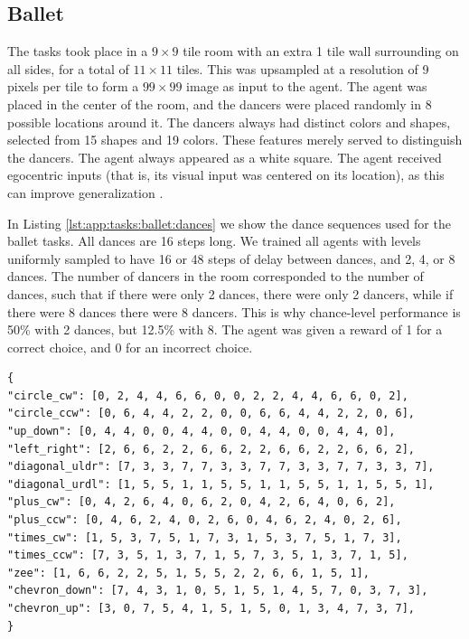 \subsection{Ballet} \label{app:tasks:ballet}
The tasks took place in a \(9 \times 9\) tile room with an extra 1 tile wall surrounding on all sides, for a total of \(11 \times 11\) tiles. This was upsampled at a resolution of 9 pixels per tile to form a \(99 \times 99\) image as input to the agent. The agent was placed in the center of the room, and the dancers were placed randomly in 8 possible locations around it. The dancers always had distinct colors and shapes, selected from 15 shapes and 19 colors. These features merely served to distinguish the dancers. The agent always appeared as a white square. The agent received egocentric inputs (that is, its visual input was centered on its location), as this can improve generalization \citep{hill2019environmental}. 

In Listing \ref{lst:app:tasks:ballet:dances} we show the dance sequences used for the ballet tasks. All dances are 16 steps long. We trained all agents with levels uniformly sampled to have 16 or 48 steps of delay between dances, and 2, 4, or 8 dances. The number of dancers in the room corresponded to the number of dances, such that if there were only 2 dances, there were only 2 dancers, while if there were 8 dances there were 8 dancers. This is why chance-level performance is 50\% with 2 dances, but 12.5\% with 8. The agent was given a reward of 1 for a correct choice, and 0 for an incorrect choice.
\begin{lstfloat}
\begin{lstlisting}
{
"circle_cw": [0, 2, 4, 4, 6, 6, 0, 0, 2, 2, 4, 4, 6, 6, 0, 2],
"circle_ccw": [0, 6, 4, 4, 2, 2, 0, 0, 6, 6, 4, 4, 2, 2, 0, 6],
"up_down": [0, 4, 4, 0, 0, 4, 4, 0, 0, 4, 4, 0, 0, 4, 4, 0],
"left_right": [2, 6, 6, 2, 2, 6, 6, 2, 2, 6, 6, 2, 2, 6, 6, 2],
"diagonal_uldr": [7, 3, 3, 7, 7, 3, 3, 7, 7, 3, 3, 7, 7, 3, 3, 7],
"diagonal_urdl": [1, 5, 5, 1, 1, 5, 5, 1, 1, 5, 5, 1, 1, 5, 5, 1],
"plus_cw": [0, 4, 2, 6, 4, 0, 6, 2, 0, 4, 2, 6, 4, 0, 6, 2],
"plus_ccw": [0, 4, 6, 2, 4, 0, 2, 6, 0, 4, 6, 2, 4, 0, 2, 6],
"times_cw": [1, 5, 3, 7, 5, 1, 7, 3, 1, 5, 3, 7, 5, 1, 7, 3],
"times_ccw": [7, 3, 5, 1, 3, 7, 1, 5, 7, 3, 5, 1, 3, 7, 1, 5],
"zee": [1, 6, 6, 2, 2, 5, 1, 5, 5, 2, 2, 6, 6, 1, 5, 1],
"chevron_down": [7, 4, 3, 1, 0, 5, 1, 5, 1, 4, 5, 7, 0, 3, 7, 3],
"chevron_up": [3, 0, 7, 5, 4, 1, 5, 1, 5, 0, 1, 3, 4, 7, 3, 7],
}
\end{lstlisting}
\caption{Dances used in the ballet task. 0-7 refer to directions of movement, clockwise from 0 = up.}
\label{lst:app:tasks:ballet:dances}
\end{lstfloat}

